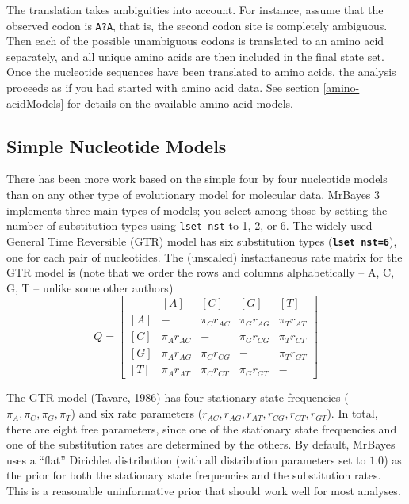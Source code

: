 \documentclass[12pt]{book}
\newcommand{\ttt}[1]{\texttt{#1}}
\newcommand{\tb}[1]{\ttt{\textbf{#1}}}
\begin{document}
The translation takes ambiguities into account. For instance, assume that the observed codon is
\ttt{A?A}, that is, the second codon site is completely ambiguous. Then each of the possible
unambiguous codons is translated to an amino acid separately, and all unique amino acids are then
included in the final state set. Once the nucleotide sequences have been translated to amino acids,
the analysis proceeds as if you had started with amino acid data. See section
\ref{amino-acidModels} for details on the available amino acid models.

\subsection{Simple Nucleotide Models}

There has been more work based on the simple four by four nucleotide models than on any other type
of evolutionary model for molecular data. MrBayes 3 implements three main types of models; you
select among those by setting the number of substitution types using \ttt{lset nst} to 1, 2, or 6.
The widely used General Time Reversible (GTR) model has six substitution types (\tb{lset nst=6}),
one for each pair of nucleotides. The (unscaled) instantaneous rate matrix for the GTR model is
(note that we order the rows and columns alphabetically -- A, C, G, T -- unlike some other authors)
\[ Q=\begin{bmatrix}
    & [A] & [C] & [G] & [T]\\
    [A]& - & \pi_C r_{AC} & \pi_G r_{AG} & \pi_T r_{AT}\\
    [C]& \pi_A r_{AC} & - & \pi_G r_{CG} &\pi_T r_{CT}\\
    [G]& \pi_A r_{AG} & \pi_C r_{CG}& - & \pi_T r_{GT}\\
    [T]& \pi_A r_{AT} & \pi_C r_{CT}&\pi_G r_{GT} & -
\end{bmatrix}
\]

The GTR model (Tavare, 1986) has four stationary state frequencies ($\pi_A, \pi_C, \pi_G, \pi_T$)
and six rate parameters ($r_{AC}, r_{AG}, r_{AT}, r_{CG}, r_{CT}, r_{GT}$). In total, there are
eight free parameters, since one of the stationary state frequencies and one of the substitution
rates are determined by the others. By default, MrBayes uses a ``flat'' Dirichlet distribution
(with all distribution parameters set to $1.0$) as the prior for both the stationary state
frequencies and the substitution rates. This is a reasonable uninformative prior that should work
well for most analyses.
\end{document}

